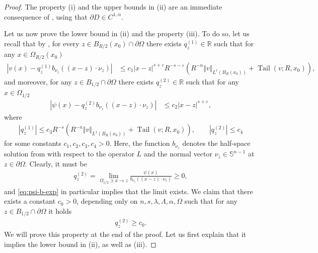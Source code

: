 \documentclass[11pt,reqno]{amsart}
\theoremstyle{plain}
\theoremstyle{definition}
\numberwithin{equation}{section}
\newcommand{\R}{\mathbb{R}}
\newcommand{\eps}{\varepsilon}
\newcommand{\1}{\mathbbm{1}}
\DeclareMathOperator{\tail}{Tail}
\begin{document}
\begin{proof}
The property (i) and the upper bounds in (ii) are an immediate consequence of \cite[Theorem~6.9]{RoWe24}, using that $\partial D \in C^{1, \alpha}$.

Let us now prove the lower bound in (ii) and the property (iii). To do so, let us recall that by \cite[Theorem~6.9]{RoWe24}, for every $z \in B_{R/2}(x_0) \cap \partial \Omega$ there exists $q_z^{(1)}\in \R$ such that for any $x \in \Omega_{R/2}(x_0)$
\begin{align}
\label{eq:v-b-exp}
|v(x) - q^{(1)}_z b_{\nu_z}((x-z) \cdot \nu_z)| &\le c_1 |x-z|^{s+\eps} R^{-s-\eps} \left(R^{-n}\Vert v \Vert_{L^1(B_R(x_0))} + \tail(v;R,x_0) \right) ,
\end{align}
and moreover, for any $z \in B_{1/2} \cap \partial \Omega$ there exists $q_z^{(2)}\in \R$ such that for any $x \in \Omega_{1/2}$
\begin{align}
\label{eq:psi-b-exp}
|\psi(x) - q^{(2)}_z b_{\nu_z}((x-z) \cdot \nu_z)| &\le c_2 |x-z|^{s+\eps},
\end{align}
where 
\begin{align}
\label{eq:qz-upper-help}
|q^{(1)}_z| \le c_3 R^{-s} \left(R^{-n}\Vert v \Vert_{L^1(B_R(x_0))} + \tail(v;R,x_0) \right), \qquad |q^{(2)}_z| \le c_4
\end{align}
for some constants $c_1,c_2,c_3,c_4 > 0$. Here, the function $b_{\nu_z}$ denotes the half-space solution from \cite[Theorem~1.4]{RoWe24} with respect to the operator $L$ and the normal vector $\nu_z \in \mathbb{S}^{n-1}$ at $z \in \partial \Omega$.
Clearly, it must be
\begin{align*}
q^{(2)}_z = \lim_{\Omega_{1/2} \ni x \to z} \frac{\psi(x)}{b_{\nu_z}((x-z) \cdot \nu_z)} \ge 0,
\end{align*}
and \eqref{eq:psi-b-exp} in particular implies that the limit exists. We claim that there exists a constant $c_0 > 0$, depending only on $n,s,\lambda,\Lambda,\alpha,\Omega$ such that for any $z \in B_{1/2} \cap \partial \Omega$ it holds
\begin{align}
\label{eq:improved-Hopf}
q^{(2)}_z \ge c_0.
\end{align}
We will prove this property at the end of the proof. Let us first explain that it implies the lower bound in (ii), as well as (iii). 


\end{proof}
\end{document}
